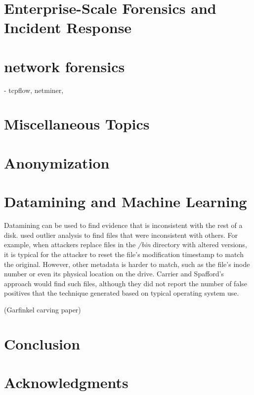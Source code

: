 \documentclass[11pt,letter]{article}
\newcommand{\citeN}[1]{\cite{#1}}
\begin{document}
\section{Enterprise-Scale Forensics and Incident Response}
\cite{dfrws2011:MichaelCohenAndDarrenBilbyAndGermanoCaronni}



\section{network forensics} 
- tcpflow, netminer, 

\section{Miscellaneous Topics}
\section{Anonymization}
\cite{dfrws2011:BilalShebaroAndJedidiahCrandall}

\section{Datamining and Machine Learning}
Datamining can be used to find evidence that is inconsistent
with the rest of a disk. 
\citeN{dfrws2005:BrianDCarrierAndEugeneHSpafford} used outlier
analysis to find files that were inconsistent with others. For
example, when attackers replace files in the \emph{/bin} directory
with altered versions, it is typical for the attacker to reset the
file's modification timestamp to match the original. However, other
metadata is harder to match, such as the file's inode number or even
its physical location on the drive.  Carrier and Spafford's approach
would find such files, although they did not report the number of
false positives that the technique generated based on typical
operating system use. 

(Garfinkel carving paper)



\section{Conclusion}\label{conclusion}
\section{Acknowledgments}
\def\showURL{}
\def\urlprefix{}
{\fontsize{9}{10}\selectfont


%
}
\end{document}
